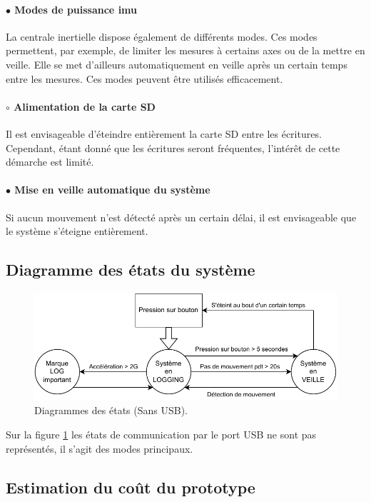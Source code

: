 \paragraph{$\bullet$ Modes de puissance \gls{imu}} La centrale inertielle dispose également de différents modes. Ces modes permettent, par exemple, de limiter les mesures à certains axes ou de la mettre en veille. Elle se met d'ailleurs automatiquement en veille après un certain temps entre les mesures. Ces modes peuvent être utilisés efficacement.

\paragraph{$\circ$ Alimentation de la carte SD} Il est envisageable d'éteindre entièrement la carte SD entre les écritures. Cependant, étant donné que les écritures seront fréquentes, l'intérêt de cette démarche est limité.

\paragraph{$\bullet$ Mise en veille automatique du système} Si aucun mouvement n'est détecté après un certain délai, il est envisageable que le système s'éteigne entièrement.

\subsection{Diagramme des états du système} 

\begin{figure}[h]
	\centering
	\includegraphics[width=0.8\linewidth]{../figures/pre_etude/Diagramme_Etat_Preetude}
	\caption{Diagrammes des états (Sans USB).}
	\label{fig:diagrammeetatpreetude}
\end{figure}

Sur la figure \ref{fig:diagrammeetatpreetude} les états de communication par le port USB ne sont pas représentés, il s'agit des modes principaux.


\clearpage

\subsection{Estimation du coût du prototype} \label{ssec:Estimation-Couts}

